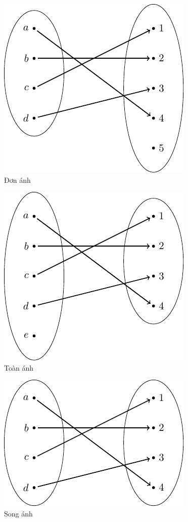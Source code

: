 \begin{figure}[ht]
    \centering
    \includegraphics{pics/maps/injection.pdf}
    \caption{Đơn ánh}
\end{figure}

\begin{figure}[ht]
    \centering
    \includegraphics{pics/maps/surjection.pdf}
    \caption{Toàn ánh}
\end{figure}

\begin{figure}[ht]
    \centering
    \includegraphics{pics/maps/bijection.pdf}
    \caption{Song ánh}
\end{figure}


